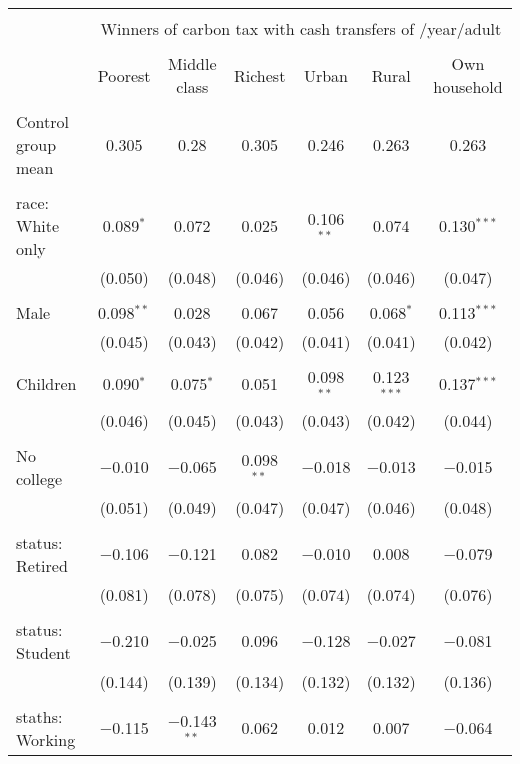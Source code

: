 
\begin{tabular}{@{\extracolsep{5pt}}lcccccc} 
\\[-1.8ex]\hline 
\hline \\[-1.8ex] 
 & \multicolumn{6}{c}{Winners of carbon tax with cash transfers of \textdollar 600/year/adult} \\ 
\cline{2-7} 
\\[-1.8ex] & Poorest & Middle class & Richest & Urban & Rural & Own household \\ 
\hline \\[-1.8ex] 
 Control group mean & 0.305 & 0.28 & 0.305 & 0.246 & 0.263 & 0.263  \\ \hline \\[-1.8ex] race: White only & 0.089$^{*}$ & 0.072 & 0.025 & 0.106$^{**}$ & 0.074 & 0.130$^{***}$ \\ 
  & (0.050) & (0.048) & (0.046) & (0.046) & (0.046) & (0.047) \\ 
  & & & & & & \\ 
 Male & 0.098$^{**}$ & 0.028 & 0.067 & 0.056 & 0.068$^{*}$ & 0.113$^{***}$ \\ 
  & (0.045) & (0.043) & (0.042) & (0.041) & (0.041) & (0.042) \\ 
  & & & & & & \\ 
 Children & 0.090$^{*}$ & 0.075$^{*}$ & 0.051 & 0.098$^{**}$ & 0.123$^{***}$ & 0.137$^{***}$ \\ 
  & (0.046) & (0.045) & (0.043) & (0.043) & (0.042) & (0.044) \\ 
  & & & & & & \\ 
 No college & $-$0.010 & $-$0.065 & 0.098$^{**}$ & $-$0.018 & $-$0.013 & $-$0.015 \\ 
  & (0.051) & (0.049) & (0.047) & (0.047) & (0.046) & (0.048) \\ 
  & & & & & & \\ 
 status: Retired & $-$0.106 & $-$0.121 & 0.082 & $-$0.010 & 0.008 & $-$0.079 \\ 
  & (0.081) & (0.078) & (0.075) & (0.074) & (0.074) & (0.076) \\ 
  & & & & & & \\ 
 status: Student & $-$0.210 & $-$0.025 & 0.096 & $-$0.128 & $-$0.027 & $-$0.081 \\ 
  & (0.144) & (0.139) & (0.134) & (0.132) & (0.132) & (0.136) \\ 
  & & & & & & \\ 
 staths: Working & $-$0.115 & $-$0.143$^{**}$ & 0.062 & 0.012 & 0.007 & $-$0.064 \\ 

\end{tabular}
